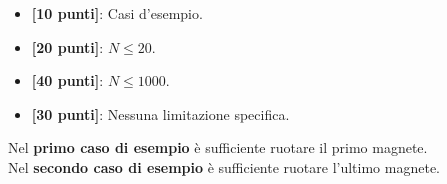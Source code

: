 \begin{itemize}[nolistsep,itemsep=2mm]
  \item \textbf{ [10 punti]}: Casi d'esempio.
  \item \textbf{ [20 punti]}: $N \leq 20$.
  \item \textbf{ [40 punti]}: $N \leq 1000$.
  \item \textbf{ [30 punti]}: Nessuna limitazione specifica.
\end{itemize}

\Examples
\begin{example}
%
\end{example}
\begin{example}
%
\end{example}


\Explanation
Nel \textbf{primo caso di esempio} è sufficiente ruotare il primo magnete.\\[2mm]
Nel \textbf{secondo caso di esempio} è sufficiente ruotare l'ultimo magnete.

